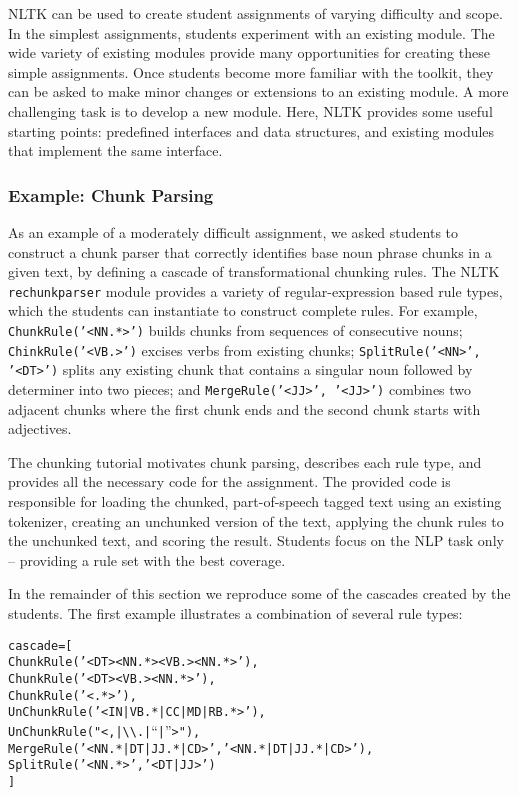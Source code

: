 \documentclass[11pt]{article}
\newenvironment{sv}{\scriptsize\begin{alltt}}{\end{alltt}\normalsize}
\begin{document}
NLTK can be used to create student assignments of varying difficulty
and scope.  
In the simplest assignments, students experiment with an existing
module.  The wide variety of existing modules provide many opportunities
for creating these simple assignments.
Once students become more familiar with the toolkit, they can be asked
to make minor changes or extensions to an existing module.
A more challenging task is to develop a new module.  Here, NLTK
provides some useful starting points: predefined interfaces and data
structures, and existing modules that implement the same interface.

\subsubsection*{Example: Chunk Parsing}

As an example of a moderately difficult assignment, we asked students
to construct a chunk parser that correctly identifies base noun phrase
chunks in a given text, by defining a cascade of transformational
chunking rules.  The NLTK \texttt{rechunkparser} module provides a
variety of regular-expression based rule types, which the students can
instantiate to construct complete rules.  For example,
\texttt{ChunkRule('<NN.*>')} builds chunks from sequences of
consecutive nouns; \texttt{ChinkRule('<VB.>')} excises verbs from
existing chunks; \texttt{SplitRule('<NN>', '<DT>')} splits any
existing chunk that contains a singular noun followed by determiner
into two pieces; and \texttt{MergeRule('<JJ>', '<JJ>')} combines two
adjacent chunks where the first chunk ends and the second chunk starts
with adjectives.

The chunking tutorial motivates chunk parsing, describes each rule
type, and provides all the necessary code for the assignment.  The
provided code is responsible for loading the chunked, part-of-speech
tagged text using an existing tokenizer, creating an unchunked version
of the text, applying the chunk rules to the unchunked text, and
scoring the result.  Students focus on the NLP task only -- providing
a rule set with the best coverage.

In the remainder of this section we reproduce some of the cascades
created by the students.  The first example illustrates a combination
of several rule types:

\begin{sv}
cascade = [
  ChunkRule('<DT><NN.*><VB.><NN.*>'),
  ChunkRule('<DT><VB.><NN.*>'),
  ChunkRule('<.*>'),
  UnChunkRule('<IN|VB.*|CC|MD|RB.*>'),
  UnChunkRule("<,|{\textbackslash}{\textbackslash}.|``|''>"),
  MergeRule('<NN.*|DT|JJ.*|CD>', '<NN.*|DT|JJ.*|CD>'),
  SplitRule('<NN.*>', '<DT|JJ>')
]
\end{sv}
\end{document}
